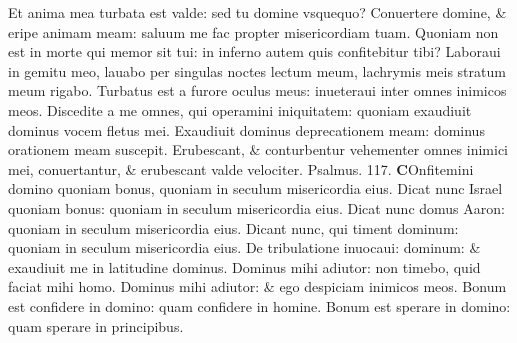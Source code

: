 \documentclass[a5paper,10pt]{book}
\begin{document}
\begin{multicols*}{2}
\newline \color{red} E\color{black}t anima mea turbata est valde: sed tu domine vsquequo?
\newline \color{red} C\color{black}onuertere domine, \& eripe animam meam: saluum me fac propter misericordiam tuam.
\newline \color{red} Q\color{black}uoniam non est in morte qui memor sit tui: in inferno autem quis confitebitur tibi?
\newline \color{red} L\color{black}aboraui in gemitu meo, lauabo per singulas noctes lectum meum, lachrymis meis stratum meum rigabo.
\newline \color{red} T\color{black}urbatus est a furore oculus meus: inueteraui inter omnes inimicos meos.
\newline \color{red} D\color{black}iscedite a me omnes, qui operamini iniquitatem: quoniam exaudiuit dominus vocem fletus mei.
\newline \color{red} E\color{black}xaudiuit dominus deprecationem meam: dominus orationem meam suscepit.
\newline \color{red} E\color{black}rubescant, \& conturbentur vehementer omnes inimici mei, conuertantur, \& erubescant valde velociter.
\newline \color{red} Psalmus. \hypertarget{ps117}{117.} \color{black}
\lettrine[lines=2]{\bfseries \color{red} C}{}Onfitemini domino quoniam bonus, quoniam in seculum misericordia eius.
\newline \color{red} D\color{black}icat nunc Israel quoniam bonus: quoniam in seculum misericordia eius.
\newline \color{red} D\color{black}icat nunc domus Aaron: quoniam in seculum misericordia eius.
\newline \color{red} D\color{black}icant nunc, qui timent dominum: quoniam in seculum misericordia eius.
\newline \color{red} D\color{black}e tribulatione inuocaui: dominum: \& exaudiuit me in latitudine dominus.
\newline \color{red} D\color{black}ominus mihi adiutor: non timebo, quid faciat mihi homo.
\newline \color{red} D\color{black}ominus mihi adiutor: \& ego despiciam inimicos meos.
\newline \color{red} B\color{black}onum est confidere in domino: quam confidere in homine.
\newline \color{red} B\color{black}onum est sperare in domino: quam sperare in principibus.

\end{multicols*}
\end{document}
